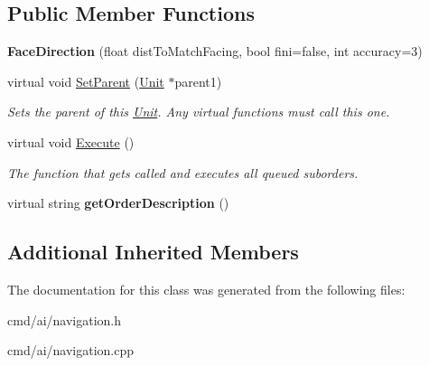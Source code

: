 \subsection*{Public Member Functions}
\begin{DoxyCompactItemize}
\item 
{\bfseries Face\+Direction} (float dist\+To\+Match\+Facing, bool fini=false, int accuracy=3)\hypertarget{classOrders_1_1FaceDirection_a24cb9cd35072890eae7e711b4b60da7c}{}\label{classOrders_1_1FaceDirection_a24cb9cd35072890eae7e711b4b60da7c}

\item 
virtual void \hyperlink{classOrders_1_1FaceDirection_a6914910bb18eff409b98ce9a7a7793d6}{Set\+Parent} (\hyperlink{classUnit}{Unit} $\ast$parent1)\hypertarget{classOrders_1_1FaceDirection_a6914910bb18eff409b98ce9a7a7793d6}{}\label{classOrders_1_1FaceDirection_a6914910bb18eff409b98ce9a7a7793d6}

\begin{DoxyCompactList}\small\item\em Sets the parent of this \hyperlink{classUnit}{Unit}. Any virtual functions must call this one. \end{DoxyCompactList}\item 
virtual void \hyperlink{classOrders_1_1FaceDirection_a3f00e75aba0462d764359c2fd26d9a62}{Execute} ()\hypertarget{classOrders_1_1FaceDirection_a3f00e75aba0462d764359c2fd26d9a62}{}\label{classOrders_1_1FaceDirection_a3f00e75aba0462d764359c2fd26d9a62}

\begin{DoxyCompactList}\small\item\em The function that gets called and executes all queued suborders. \end{DoxyCompactList}\item 
virtual string {\bfseries get\+Order\+Description} ()\hypertarget{classOrders_1_1FaceDirection_a0a2a93491045d0a130420d2f2af2a1b3}{}\label{classOrders_1_1FaceDirection_a0a2a93491045d0a130420d2f2af2a1b3}

\end{DoxyCompactItemize}
\subsection*{Additional Inherited Members}


The documentation for this class was generated from the following files\+:\begin{DoxyCompactItemize}
\item 
cmd/ai/navigation.\+h\item 
cmd/ai/navigation.\+cpp\end{DoxyCompactItemize}
